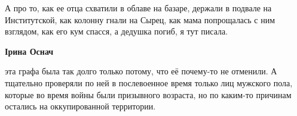 \begin{itemize}
\begin{itemize}
А про то, как ее отца схватили в облаве на базаре, держали в подвале на
Институтской, как колонну гнали на Сырец, как мама попрощалась с ним взглядом,
как его кум спасся, а дедушка погиб, я тут писала.

\begin{itemize} %
\textbf{Ірина Оснач} 

эта графа была так долго только потому, что её почему-то не отменили. А
тщательно проверяли по ней в послевоенное время только лиц мужского пола,
которые во время войны были призывного возраста, но по каким-то причинам
остались на оккупированной территории.

\end{itemize} %

\end{itemize} %

\end{itemize} %
